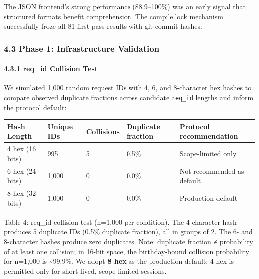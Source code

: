 The JSON frontend's strong performance (88.9--100\%) was an early signal that structured formats benefit comprehension. The compile.lock mechanism successfully froze all 81 first-pass results with git commit hashes.



\subsubsection{4.3 Phase 1: Infrastructure Validation}\label{phase-1-infrastructure-validation}



\paragraph{4.3.1 req\_id Collision Test}\label{req_id-collision-test}



We simulated 1,000 random request IDs with 4, 6, and 8-character hex hashes to compare observed duplicate fractions across candidate \texttt{req\_id} lengths and inform the protocol default:



{\def\LTcaptype{none} %

\begin{longtable}[]{@{}lllll@{}}

\toprule\noalign{}

Hash Length & Unique IDs & Collisions & Duplicate fraction & Protocol recommendation \\

\midrule\noalign{}

\endhead

\bottomrule\noalign{}

\endlastfoot

4 hex (16 bits) & 995 & 5 & 0.5\% & Scope-limited only \\

6 hex (24 bits) & 1,000 & 0 & 0.0\% & Not recommended as default \\

8 hex (32 bits) & 1,000 & 0 & 0.0\% & Production default \\

\end{longtable}

}



Table 4: req\_id collision test (n=1,000 per condition). The 4-character hash produces 5 duplicate IDs (0.5\% duplicate fraction), all in groups of 2. The 6- and 8-character hashes produce zero duplicates. Note: duplicate fraction ≠ probability of at least one collision; in 16-bit space, the birthday-bound collision probability for n=1,000 is \textasciitilde99.9\%. We adopt \textbf{8 hex} as the production default; 4 hex is permitted only for short-lived, scope-limited sessions.



